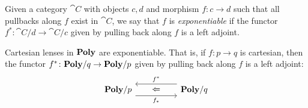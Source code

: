 \documentclass[Book-Poly]{subfiles}
\begin{document}
\begin{definition}
Given a category $\cat{C}$ with objects $c, d$ and morphism $f \colon c \to d$ such that all pullbacks along $f$ exist in $\cat{C}$, we say that $f$ is \emph{exponentiable} if the functor $f^* \colon \cat{C}/d \to \cat{C}/c$ given by pulling back along $f$ is a left adjoint.
\end{definition}

\begin{theorem}\label{thm.cart_exponentiable}
Cartesian lenses in $\mathbf{Poly}$ are exponentiable.
That is, if $f\colon p\to q$ is cartesian, then the functor $f^*\colon\mathbf{Poly}/q\to\mathbf{Poly}/p$ given by pulling back along $f$ is a left adjoint:
\[
\begin{tikzcd}[column sep=50pt, background color=theoremcolor]
	\poly/p\ar[r, shift right=7pt, "f_*"']&
	\poly/q\ar[l, shift right=7pt, "f^*"']\ar[l, phantom, "\Leftarrow"]
\end{tikzcd}
\]
\end{theorem}
\end{document}

